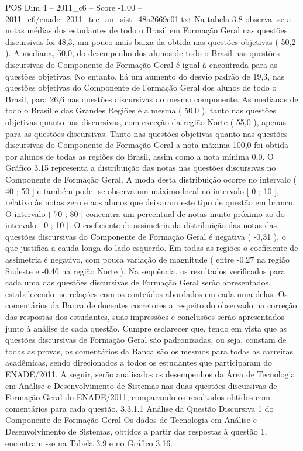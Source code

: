 \begin{textsample}{POS Dim 4 – 2011\_c6 – Score -1.00 – 2011\_c6/enade\_2011\_tec\_an\_sist\_48a2669c01.txt}
Na tabela 3.8 observa -se a notas médias dos estudantes de todo o Brasil em Formação Geral nas questões discursivas foi 48,3, um pouco mais baixa da obtida nas questões objetivas ( 50,2 ).
A mediana, 50,0, do desempenho dos alunos de todo o Brasil nas questões discursivas do Componente de Formação Geral é igual à encontrada para as questões objetivas.
No entanto, há um aumento do desvio padrão de 19,3, nas questões objetivas do Componente de Formação Geral dos alunos de todo o Brasil, para 26,6 nas questões discursivas do mesmo componente.
As medianas de todo o Brasil e das Grandes Regiões é a mesma ( 50,0 ), tanto nas questões objetivas quanto nas discursivas, com exceção da região Norte ( 55,0 ), apenas para as questões discursivas.
Tanto nas questões objetivas quanto nas questões discursivas do Componente de Formação Geral a nota máxima 100,0 foi obtida por alunos de todas as regiões do Brasil, assim como a nota mínima 0,0.
O Gráfico 3.15 representa a distribuição das notas nas questões discursivas no Componente de Formação Geral.
A moda desta distribuição ocorre no intervalo ( 40 ; 50 ] e também pode -se observa um máximo local no intervalo [ 0 ; 10 ], relativo às notas zero e aos alunos que deixaram este tipo de questão em branco.
O intervalo ( 70 ; 80 ] concentra um percentual de notas muito próximo ao do intervalo [ 0 ; 10 ].
O coeficiente de assimetria da distribuição das notas das questões discursivas do Componente de Formação Geral é negativa ( -0,31 ), o que justifica a cauda longa do lado esquerdo.
Em todas as regiões o coeficiente de assimetria é negativo, com pouca variação de magnitude ( entre -0,27 na região Sudeste e -0,46 na região Norte ).
Na sequência, os resultados verificados para cada uma das questões discursivas de Formação Geral serão apresentados, estabelecendo -se relações com os conteúdos abordados em cada uma delas.
Os comentários da Banca de docentes corretores a respeito do observado na correção das respostas dos estudantes, suas impressões e conclusões serão apresentados junto à análise de cada questão.
Cumpre esclarecer que, tendo em vista que as questões discursivas de Formação Geral são padronizadas, ou seja, constam de todas as provas, os comentários da Banca são os mesmos para todas as carreiras acadêmicas, sendo direcionados a todos os estudantes que participaram do ENADE/2011.
A seguir, serão analisados os desempenhos da Área de Tecnologia em Análise e Desenvolvimento de Sistemas nas duas questões discursivas de Formação Geral do ENADE/2011, comparando os resultados obtidos com comentários para cada questão. 3.3.1.1 Análise da Questão Discursiva 1 do Componente de Formação Geral Os dados de Tecnologia em Análise e Desenvolvimento de Sistemas, obtidos a partir das respostas à questão 1, encontram -se na Tabela 3.9 e no Gráfico 3.16.

\end{textsample}
